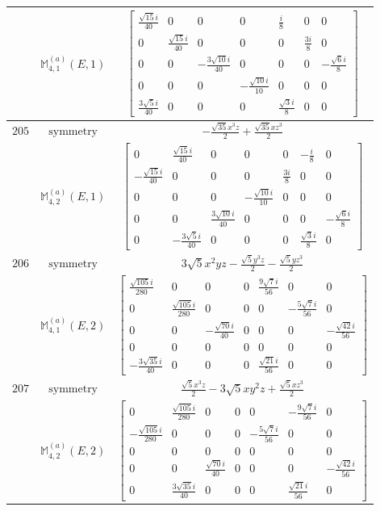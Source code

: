 \documentclass[fleqn,8pt,landscape]{jsarticle}
\begin{document}
\begin{longtable}{ccc}
$  $ & $ \mathbb{M}_{4,1}^{(a)}(E,1) $ & $ \begin{bmatrix} \frac{\sqrt{15} i}{40} & 0 & 0 & 0 & \frac{i}{8} & 0 & 0 \\ 0 & \frac{\sqrt{15} i}{40} & 0 & 0 & 0 & \frac{3 i}{8} & 0 \\ 0 & 0 & - \frac{3 \sqrt{10} i}{40} & 0 & 0 & 0 & - \frac{\sqrt{6} i}{8} \\ 0 & 0 & 0 & - \frac{\sqrt{10} i}{10} & 0 & 0 & 0 \\ \frac{3 \sqrt{5} i}{40} & 0 & 0 & 0 & \frac{\sqrt{3} i}{8} & 0 & 0 \end{bmatrix} $ \\ \hline
$ 205 $ & $ \text{symmetry} $ & $ - \frac{\sqrt{35} x^{3} z}{2} + \frac{\sqrt{35} x z^{3}}{2} $ \\
$  $ & $ \mathbb{M}_{4,2}^{(a)}(E,1) $ & $ \begin{bmatrix} 0 & \frac{\sqrt{15} i}{40} & 0 & 0 & 0 & - \frac{i}{8} & 0 \\ - \frac{\sqrt{15} i}{40} & 0 & 0 & 0 & \frac{3 i}{8} & 0 & 0 \\ 0 & 0 & 0 & - \frac{\sqrt{10} i}{10} & 0 & 0 & 0 \\ 0 & 0 & \frac{3 \sqrt{10} i}{40} & 0 & 0 & 0 & - \frac{\sqrt{6} i}{8} \\ 0 & - \frac{3 \sqrt{5} i}{40} & 0 & 0 & 0 & \frac{\sqrt{3} i}{8} & 0 \end{bmatrix} $ \\ \hline
$ 206 $ & $ \text{symmetry} $ & $ 3 \sqrt{5} x^{2} y z - \frac{\sqrt{5} y^{3} z}{2} - \frac{\sqrt{5} y z^{3}}{2} $ \\
$  $ & $ \mathbb{M}_{4,1}^{(a)}(E,2) $ & $ \begin{bmatrix} \frac{\sqrt{105} i}{280} & 0 & 0 & 0 & \frac{9 \sqrt{7} i}{56} & 0 & 0 \\ 0 & \frac{\sqrt{105} i}{280} & 0 & 0 & 0 & - \frac{5 \sqrt{7} i}{56} & 0 \\ 0 & 0 & - \frac{\sqrt{70} i}{40} & 0 & 0 & 0 & - \frac{\sqrt{42} i}{56} \\ 0 & 0 & 0 & 0 & 0 & 0 & 0 \\ - \frac{3 \sqrt{35} i}{40} & 0 & 0 & 0 & \frac{\sqrt{21} i}{56} & 0 & 0 \end{bmatrix} $ \\ \hline
$ 207 $ & $ \text{symmetry} $ & $ \frac{\sqrt{5} x^{3} z}{2} - 3 \sqrt{5} x y^{2} z + \frac{\sqrt{5} x z^{3}}{2} $ \\
$  $ & $ \mathbb{M}_{4,2}^{(a)}(E,2) $ & $ \begin{bmatrix} 0 & \frac{\sqrt{105} i}{280} & 0 & 0 & 0 & - \frac{9 \sqrt{7} i}{56} & 0 \\ - \frac{\sqrt{105} i}{280} & 0 & 0 & 0 & - \frac{5 \sqrt{7} i}{56} & 0 & 0 \\ 0 & 0 & 0 & 0 & 0 & 0 & 0 \\ 0 & 0 & \frac{\sqrt{70} i}{40} & 0 & 0 & 0 & - \frac{\sqrt{42} i}{56} \\ 0 & \frac{3 \sqrt{35} i}{40} & 0 & 0 & 0 & \frac{\sqrt{21} i}{56} & 0 \end{bmatrix} $ \\ \hline
\end{longtable}
\end{document}
